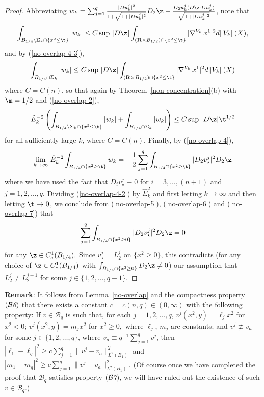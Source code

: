 \documentclass[a4paper,11pt]{amsart}
\begin{document}
\begin{proof}
Abbreviating $w_{k} = \sum_{j=1}^{q}\frac{|D{u}_{k}^{j}|^{2}}{1 + \sqrt{1 + |D{u}_{k}^{j}|^{2}}} D_{2}\z - \frac{D_{2}{u}_{k}^{j} (D\z \cdot D{u}_{k}^{j})}{\sqrt{1 + |D{u}_{k}^{j}|^{2}}}$, note that  
$$\int_{B_{1/4} \setminus \Sigma_{k} \cap \{x^{2} \leq \t\}} |w_{k}| \leq C \sup \, |D\z| \int_{({\mathbf R} \times B_{1/2}) \cap \{x^{2} \leq \t\}} |\nabla^{V_{k}} \, x^{1}|^{2} d\|V_{k}\|(X),$$
and by (\ref{no-overlap-4-3}),
$$ \int_{B_{1/4} \cap \Sigma_{k}} |w_{k}|  \leq C \sup \, |D\z| \int_{({\mathbf R} \times B_{1/2}) \cap \{x^{2} \leq \t\}} |\nabla^{V_{k}} \, x^{1}|^{2} d\|V_{k}\|(X)$$
where $C = C(n)$, so that again by Theorem~\ref{non-concentration}(b) with $\m=1/2$ and (\ref{no-overlap-2}), 
\begin{equation}\label{no-overlap-6}
{\hat E_{k}}^{-2} \left(\int_{B_{1/4} \setminus \Sigma_{k} \cap \{x^{2} \leq \t\}} |w_{k}| + \int_{B_{1/4} \cap  \Sigma_{k}} |w_{k}|\right) \leq C\sup \, |D\z|\t^{1/2}
\end{equation}
for all sufficiently large $k$, where $C = C(n)$. Finally, by (\ref{no-overlap-4}), 
\begin{equation}\label{no-overlap-7}
\lim_{k \to \infty} \, {\hat E_{k}}^{-2} \int_{B_{1/4} \cap \{x^{2} \geq \t\}} w_{k} = -\frac{1}{2}\sum_{j=1}^{q}\int_{B_{1/4} \cap \{x^{2} \geq \t\}} |D_{2}v_{\star}^{j}|^{2}D_{2} \z
\end{equation}
where we have used the fact that $D_{i} v_{\star}^{j} \equiv 0$ for $i=3, \ldots, (n+1)$ and 
$j= 1, 2, \ldots, q.$ Dividing (\ref{no-overlap-4-2}) by ${\hat E}_{k}^{2}$ and first letting $k \to \infty$ and 
then letting $\t \to 0$, we conclude from (\ref{no-overlap-5}), (\ref{no-overlap-6}) and 
(\ref{no-overlap-7}) that 
$$\sum_{j=1}^{q}\int_{B_{1/4} \cap \{x^{2} \geq 0\}} |D_{2}v^{j}_{\star}|^{2} D_{2}\z = 0$$
for any $\z \in C^{1}_{c}(B_{1/4}).$ Since $v^{j}_{\star} = L_{2}^{j}$ on $\{x^{2} \geq 0\}$, this contradicts (for any choice of $\z \in C^{1}_{c}(B_{1/4})$ with 
$\int_{B_{1/4} \cap \{x^{2} \geq 0\}} D_{2}\z \neq 0$) our assumption that  $L_{2}^{j} \neq L_{2}^{j+1}$ 
for some $j \in \{1, 2, \ldots, q-1\}$.
\end{proof}


\noindent
{\bf Remark}: It follows from Lemma~\ref{no-overlap} and the compactness property $({\mathcal B{\emph 6}})$ that there exists a constant $c = c(n, q) \in (0, \infty)$ with the following property:   
If  $v \in {\mathcal B}_{q}$ is such that, for each $j= 1, 2, \ldots, q$, 
$v^{j}(x^{2}, y) =  \ell_{j}x^{2}$ for $x^{2} < 0$; 
$v^{j}(x^{2}, y) = m_{j}x^{2}$ for $x^{2} \geq 0,$ where $\ell_{j}$, $m_{j}$ are constants; and $v^{j} \not\equiv v_{a}$ for some $j \in \{1, 2, \ldots, q\}$, where $v_{a}  \equiv q^{-1}\sum_{j=1}^{q}v^{j}$, then 
$|\ell_{1} - \ell_{q}|^{2} \geq c\sum_{j=1}^{q}\|v^{j} - v_{a}\|^{2}_{L^{2}(B_{1})}$ and $|m_{1} - m_{q}|^{2} \geq c\sum_{j=1}^{q}\|v^{j} - v_{a}\|^{2}_{L^{2}(B_{1})}.$ (Of course once we have completed the proof that ${\mathcal B}_{q}$ satisfies property 
$({\mathcal B{\emph 7}})$, we will have ruled out the existence of such $v \in {\mathcal B}_{q}.$)
\end{document}
